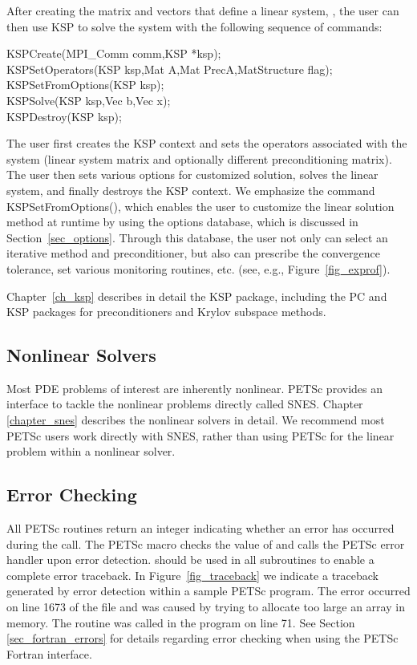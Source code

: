 After creating the matrix and vectors that define a linear system,
, the user can then use KSP to solve the system 
with the following sequence of commands: 
\begin{tabbing}
  KSPCreate(MPI\_Comm comm,KSP *ksp); \\
  KSPSetOperators(KSP ksp,Mat A,Mat PrecA,MatStructure flag);\\
  KSPSetFromOptions(KSP ksp);\\
  KSPSolve(KSP ksp,Vec b,Vec x);\\
  KSPDestroy(KSP ksp);
\end{tabbing}
The user first creates the KSP context and sets the operators
associated with the system (linear system matrix and optionally different
preconditioning matrix).  The user then sets various options for
customized solution, solves the linear system, and finally destroys
the KSP context.  We emphasize the command KSPSetFromOptions(), 
which enables the user to customize the linear solution
method at runtime by using the options database, which is discussed in
Section~\ref{sec_options}. Through this database, the user not only
can select an iterative method and preconditioner, but also can prescribe
the convergence tolerance, set various monitoring routines, etc.
(see, e.g., Figure~\ref{fig_exprof}).

Chapter~\ref{ch_ksp} describes in detail the KSP package, including
the PC and KSP packages for preconditioners and Krylov subspace methods.

\subsection*{Nonlinear Solvers}
Most PDE problems of interest are inherently nonlinear. PETSc provides 
an interface to tackle the nonlinear problems directly called SNES. Chapter
\ref{chapter_snes} describes the nonlinear solvers in detail. We recommend 
most PETSc users work directly with SNES, rather than using PETSc
for the linear problem within a nonlinear solver.

\subsection*{Error Checking}

All PETSc routines return an integer indicating whether an error
has occurred during the call.  The PETSc macro 
checks the value of  and calls the PETSc error handler
upon error detection.   should be used in all
subroutines to enable a complete error traceback.
In Figure~\ref{fig_traceback} we indicate a
traceback generated by error detection within a sample PETSc
program. The error occurred on line 1673 of the file  and was caused by trying to allocate too
large an array in memory. The routine was called in the program 
 on line 71.  See Section \ref{sec_fortran_errors} for
details regarding error checking when using the PETSc Fortran interface.

